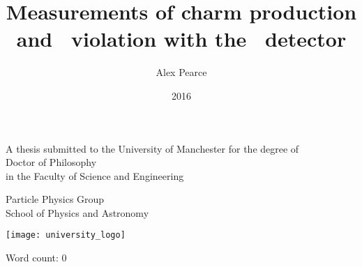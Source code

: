 \documentclass[a4paper,11pt]{memoir}
\author{Alex Pearce}
\title{%
  Measurements of charm production and
  \texorpdfstring{\CP}{CP}\ violation
  with the \lhcb\ detector
}
\date{2016}
\begin{document}
\begin{titlingpage}
  \begin{center}
    \textbf{\huge\thetitle}

    \vfill

    A thesis submitted to the University of Manchester for the degree of\\
    Doctor of Philosophy\\
    in the Faculty of Science and Engineering\\

    \vspace{0.8cm}

    \textbf{\thedate}

    \vfill

    \textbf{\theauthor}

    \vspace{0.8cm}

    Particle Physics Group\\
    School of Physics and Astronomy\\

    \vspace{0.8cm}

    \texttt{[image: university\_logo]}

    \iftoggle{draft}{%
      \vspace{0.8cm}
      \texttt{Draft generated on \today}
    }{}
  \end{center}
\end{titlingpage}

\frontmatter


\tableofcontents*

\vspace{1cm}
\noindent
Word count: 0

\cleardoublepage



\cleardoublepage



\cleardoublepage



\cleardoublepage



\cleardoublepage
\end{document}
